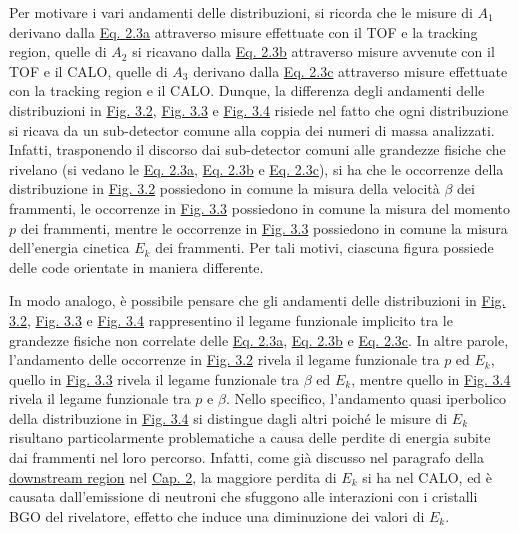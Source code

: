 \documentclass[12pt,a4paper,twoside]{report}
\begin{document}
	Per motivare i vari andamenti delle distribuzioni, si ricorda che le misure di $A_1$ derivano dalla \hyperref[eq:a1]{Eq. 2.3a} attraverso misure effettuate con il TOF e la tracking region, quelle di $A_2$ si ricavano dalla \hyperref[eq:a2]{Eq. 2.3b} attraverso misure avvenute con il TOF e il CALO, quelle di $A_3$ derivano dalla \hyperref[eq:a3]{Eq. 2.3c} attraverso misure effettuate con la tracking region e il CALO. Dunque, la differenza degli andamenti delle distribuzioni in \hyperref[fig:a1]{Fig. 3.2}, \hyperref[fig:a2]{Fig. 3.3} e \hyperref[fig:a3]{Fig. 3.4} risiede nel fatto che ogni distribuzione si ricava da un sub-detector comune alla coppia dei numeri di massa analizzati. Infatti, trasponendo il discorso dai sub-detector comuni alle grandezze fisiche che rivelano (si vedano le \hyperref[eq:a1]{Eq. 2.3a}, \hyperref[eq:a2]{Eq. 2.3b} e \hyperref[eq:a3]{Eq. 2.3c}), si ha che le occorrenze della distribuzione in \hyperref[fig:a1]{Fig. 3.2} possiedono in comune la misura della velocità $\beta$ dei frammenti, le occorrenze in \hyperref[fig:a2]{Fig. 3.3} possiedono in comune la misura del momento $p$ dei frammenti, mentre le occorrenze in \hyperref[fig:a2]{Fig. 3.3} possiedono in comune la misura dell'energia cinetica $E_k$ dei frammenti. Per tali motivi, ciascuna figura possiede delle code orientate in maniera differente.
	
	In modo analogo, è possibile pensare che gli andamenti delle distribuzioni in \hyperref[fig:a1]{Fig. 3.2}, \hyperref[fig:a2]{Fig. 3.3} e \hyperref[fig:a3]{Fig. 3.4} rappresentino il legame funzionale implicito tra le grandezze fisiche non correlate delle \hyperref[eq:a1]{Eq. 2.3a}, \hyperref[eq:a2]{Eq. 2.3b} e \hyperref[eq:a3]{Eq. 2.3c}. In altre parole, l'andamento delle occorrenze in \hyperref[fig:a1]{Fig. 3.2} rivela il legame funzionale tra $p$ ed $E_k$, quello in \hyperref[fig:a2]{Fig. 3.3} rivela il legame funzionale tra $\beta$ ed $E_k$, mentre quello in \hyperref[fig:a3]{Fig. 3.4} rivela il legame funzionale tra $p$ e $\beta$. Nello specifico, l'andamento quasi iperbolico della distribuzione in \hyperref[fig:a3]{Fig. 3.4} si distingue dagli altri poiché le misure di $E_k$ risultano particolarmente problematiche a causa delle perdite di energia subite dai frammenti nel loro percorso. Infatti, come già discusso nel paragrafo della \hyperref[par:downstream_region]{downstream region} nel \hyperref[cap:2]{Cap. 2}, la maggiore perdita di $E_k$ si ha nel CALO, ed è causata dall'emissione di neutroni che sfuggono alle interazioni con i cristalli BGO del rivelatore, effetto che induce una diminuzione dei valori di $E_k$.
	
\end{document}
